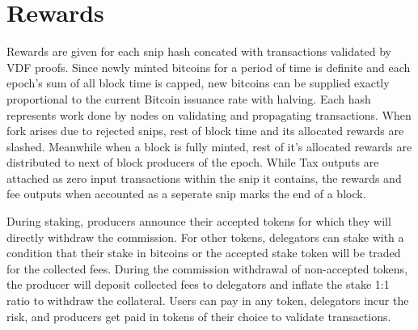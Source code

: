 \documentclass[a4paper,10pt]{article}
\begin{document}
\section{Rewards}

Rewards are given for each snip hash concated with transactions validated by VDF proofs. Since newly minted bitcoins for a period of time is definite and each epoch's sum of all block time is capped, new bitcoins can be supplied exactly proportional to the current Bitcoin issuance rate with halving. Each hash represents work done by nodes on validating and propagating transactions. When fork arises due to rejected snips, rest of block time and its allocated rewards are slashed. Meanwhile when a block is fully minted, rest of it's allocated rewards are distributed to next of block producers of the epoch. While Tax outputs are attached as zero input transactions within the snip it contains, the rewards and fee outputs when accounted as a seperate snip marks the end of a block. 

During staking, producers announce their accepted tokens for which they will directly withdraw the commission. For other tokens, delegators can stake with a condition that their stake in bitcoins or the accepted stake token will be traded for the collected fees. During the commission withdrawal of non-accepted tokens, the producer will deposit collected fees to delegators and inflate the stake 1:1 ratio to withdraw the collateral. Users can pay in any token, delegators incur the risk, and producers get paid in tokens of their choice to validate transactions.
\end{document}
